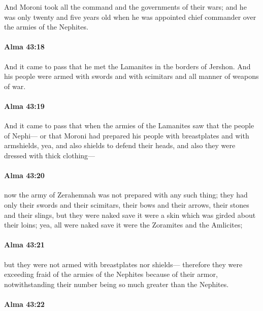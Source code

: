 			And Moroni took all the command and the governments of their wars;
			and he was only twenty and five years old
			when he was appointed chief commander over the armies of the Nephites.

		\paragraph{Alma 43:18} %
			\label{ALMA-43-18}

			And it came to pass that he met the Lamanites in the borders of Jershon.
			And his people were armed with swords
			and with scimitars and all manner of weapons of war.

		\paragraph{Alma 43:19} %
			\label{ALMA-43-19}

			And it came to pass that
			when the armies of the Lamanites saw
			that the people of Nephi---
			or that Moroni had prepared his people with breastplates and with armshields,
			yea, and also shields to defend their heads,
			and also they were dressed with thick clothing---

		\paragraph{Alma 43:20} %
			\label{ALMA-43-20}

			now the army of Zerahemnah was not prepared with any such thing;
			they had only their swords and their scimitars,
			their bows and their arrows,
			their stones and their slings,
			but they were naked save it were a skin which was girded about their loins;
			yea, all were naked save it were the Zoramites and the Amlicites;

		\paragraph{Alma 43:21} %
			\label{ALMA-43-21}

			but they were not armed with breastplates nor shields---
			therefore they were exceeding fraid of the armies of the Nephites
			because of their armor,
			notwithstanding their number being so much greater than the Nephites.

		\paragraph{Alma 43:22} %
			\label{ALMA-43-22}

